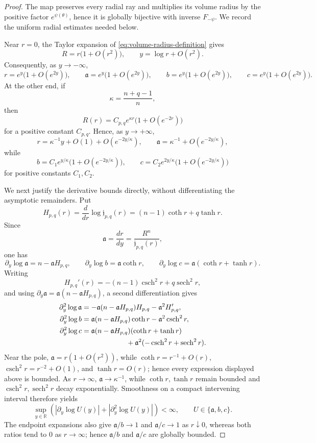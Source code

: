 \documentclass[11pt,reqno]{amsart}
\numberwithin{equation}{section}
\theoremstyle{definition}
\theoremstyle{remark}
\begin{document}
\begin{proof}
The map preserves every radial ray and multiplies its volume radius by the
positive factor $e^{\psi(\theta)}$, hence it is globally bijective with inverse
$F_{-\psi}$.  We record the uniform radial estimates needed below.

Near $r=0$, the Taylor expansion of \eqref{eq:volume-radius-definition} gives
\[
R=r\bigl(1+O(r^2)\bigr),
\qquad
y=\log r+O(r^2).
\]
Consequently, as $y\to-\infty$,
\[
r=e^y\bigl(1+O(e^{2y})\bigr),
\qquad
\mathfrak a=e^y\bigl(1+O(e^{2y})\bigr),
\qquad
b=e^y\bigl(1+O(e^{2y})\bigr),
\qquad
c=e^y\bigl(1+O(e^{2y})\bigr).
\]
At the other end, if
\[
\kappa=\frac{n+q-1}{n},
\]
then
\[
R(r)=C_{p,q}e^{\kappa r}\bigl(1+O(e^{-2r})\bigr)
\]
for a positive constant $C_{p,q}$.  Hence, as $y\to+\infty$,
\[
r=\kappa^{-1}y+O(1)+O(e^{-2y/\kappa}),
\qquad
\mathfrak a=\kappa^{-1}+O(e^{-2y/\kappa}),
\]
while
\[
b=C_1e^{y/\kappa}\bigl(1+O(e^{-2y/\kappa})\bigr),
\qquad
c=C_2e^{2y/\kappa}\bigl(1+O(e^{-2y/\kappa})\bigr)
\]
for positive constants $C_1,C_2$.

We next justify the derivative bounds directly, without differentiating the
asymptotic remainders.  Put
\[
H_{p,q}(r)
=
\frac{d}{dr}\log\mathfrak j_{p,q}(r)
=
(n-1)\coth r+q\tanh r.
\]
Since
\[
\mathfrak a=\frac{dr}{dy}=\frac{R^n}{\mathfrak j_{p,q}(r)},
\]
one has
\[
\partial_y\log\mathfrak a=n-\mathfrak a H_{p,q},
\qquad
\partial_y\log b=\mathfrak a\coth r,
\qquad
\partial_y\log c=\mathfrak a(\coth r+\tanh r).
\]
Writing
\[
H_{p,q}'(r)=-(n-1)\operatorname{csch}^2r
+q\operatorname{sech}^2r,
\]
and using
$\partial_y\mathfrak a=\mathfrak a(n-\mathfrak a H_{p,q})$, a second
differentiation gives
\[
\begin{aligned}
\partial_y^2\log\mathfrak a
&=-\mathfrak a(n-\mathfrak a H_{p,q})H_{p,q}
  -\mathfrak a^2H_{p,q}',\\
\partial_y^2\log b
&=\mathfrak a(n-\mathfrak a H_{p,q})\coth r
  -\mathfrak a^2\operatorname{csch}^2r,\\
\partial_y^2\log c
&=\mathfrak a(n-\mathfrak a H_{p,q})(\coth r+\tanh r)\\
&\hspace{2.2cm}
  +\mathfrak a^2(-\operatorname{csch}^2r+\operatorname{sech}^2r).
\end{aligned}
\]
Near the pole, $\mathfrak a=r(1+O(r^2))$, while
$\coth r=r^{-1}+O(r)$,
$\operatorname{csch}^2r=r^{-2}+O(1)$, and $\tanh r=O(r)$;
hence every expression displayed above is bounded.  As $r\to\infty$,
$\mathfrak a\to\kappa^{-1}$, while $\coth r,\tanh r$ remain bounded and
$\operatorname{csch}^2r,\operatorname{sech}^2r$ decay exponentially.
Smoothness on a compact intervening interval therefore yields
\begin{equation}
\sup_{y\in\mathbb R}
\left(
|\partial_y\log U(y)|+|\partial_y^2\log U(y)|
\right)<\infty,
\qquad
U\in\{\mathfrak a,b,c\}.
\label{eq:rank-one-log-derivative-bounds}
\end{equation}
The endpoint expansions also give
$\mathfrak a/b\to1$ and $\mathfrak a/c\to1$ as $r\downarrow0$, whereas
both ratios tend to $0$ as $r\to\infty$; hence
$\mathfrak a/b$ and $\mathfrak a/c$ are globally bounded.


\end{proof}
\end{document}
